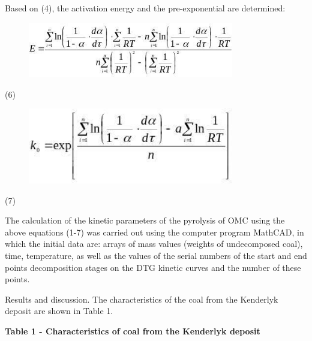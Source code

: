 Based on (4), the activation energy and the pre-exponential are
determined:

\begin{figure}[H]
	\centering
	\includegraphics[width=0.8\textwidth]{assets/1064}
	\caption*{}
\end{figure} (6)

\begin{figure}[H]
	\centering
	\includegraphics[width=0.8\textwidth]{assets/1065}
	\caption*{}
\end{figure} (7)

The calculation of the kinetic parameters of the pyrolysis of OMC using
the above equations (1-7) was carried out using the computer program
MathCAD, in which the initial data are: arrays of mass values (weights
of undecomposed coal), time, temperature, as well as the values of the
serial numbers of the start and end points decomposition stages on the
DTG kinetic curves and the number of these points.

Results and discussion. The characteristics of the coal from the
Kenderlyk deposit are shown in Table 1.

\textbf{Table 1 - Characteristics of coal from the Kenderlyk deposit}

